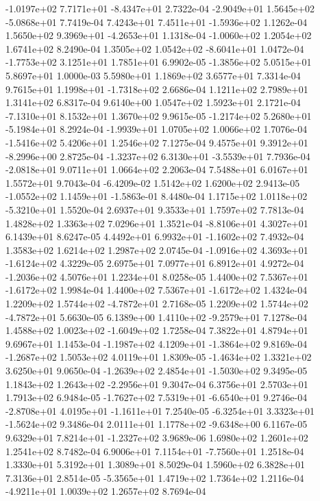 -1.0197e+02  7.7171e+01 -8.4347e+01  2.7322e-04
-2.9049e+01  1.5645e+02 -5.0868e+01  7.7419e-04
 7.4243e+01  7.4511e+01 -1.5936e+02  1.1262e-04
 1.5650e+02  9.3969e+01 -4.2653e+01  1.1318e-04
-1.0060e+02  1.2054e+02  1.6741e+02  8.2490e-04
 1.3505e+02  1.0542e+02 -8.6041e+01  1.0472e-04
-1.7753e+02  3.1251e+01  1.7851e+01  6.9902e-05
-1.3856e+02  5.0515e+01  5.8697e+01  1.0000e-03
5.5980e+01 1.1869e+02 3.6577e+01  7.3314e-04
 9.7615e+01  1.1998e+01 -1.7318e+02  2.6686e-04
1.1211e+02 2.7989e+01 1.3141e+02  6.8317e-04
9.6140e+00 1.0547e+02 1.5923e+01  2.1721e-04
-7.1310e+01  8.1532e+01  1.3670e+02  9.9615e-05
-1.2174e+02  5.2680e+01 -5.1984e+01  8.2924e-04
-1.9939e+01  1.0705e+02  1.0066e+02  1.7076e-04
-1.5416e+02  5.4206e+01  1.2546e+02  7.1275e-04
 9.4575e+01  9.3912e+01 -8.2996e+00  2.8725e-04
-1.3237e+02  6.3130e+01 -3.5539e+01  7.7936e-04
-2.0818e+01  9.0711e+01  1.0664e+02  2.2063e-04
7.5488e+01 6.0167e+01 1.5572e+01  9.7043e-04
-6.4209e-02  1.5142e+02  1.6200e+02  2.9413e-05
-1.0552e+02  1.1459e+01 -1.5863e-01  8.4480e-04
 1.1715e+02  1.0118e+02 -5.3210e+01  1.5520e-04
2.6937e+01 9.3533e+01 1.7597e+02  7.7813e-04
1.4828e+02 1.3363e+02 7.0296e+01  1.3521e-04
-8.8106e+01  4.3027e+01  6.1439e+01  8.6247e-05
 4.4492e+01  6.9932e+01 -1.1602e+02  7.4932e-04
1.3583e+02 1.6214e+02 1.2987e+02  2.0745e-04
-1.0916e+02  4.3693e+01 -1.6124e+02  4.3229e-05
2.6975e+01 7.0977e+01 6.8912e+01  4.9272e-04
-1.2036e+02  4.5076e+01  1.2234e+01  8.0258e-05
 1.4400e+02  7.5367e+01 -1.6172e+02  1.9984e-04
 1.4400e+02  7.5367e+01 -1.6172e+02  1.4324e-04
 1.2209e+02  1.5744e+02 -4.7872e+01  2.7168e-05
 1.2209e+02  1.5744e+02 -4.7872e+01  5.6630e-05
 6.1389e+00  1.4110e+02 -9.2579e+01  7.1278e-04
 1.4588e+02  1.0023e+02 -1.6049e+02  1.7258e-04
7.3822e+01 4.8794e+01 9.6967e+01  1.1453e-04
-1.1987e+02  4.1209e+01 -1.3864e+02  9.8169e-04
-1.2687e+02  1.5053e+02  4.0119e+01  1.8309e-05
-1.4634e+02  1.3321e+02  3.6250e+01  9.0650e-04
-1.2639e+02  2.4854e+01 -1.5030e+02  9.3495e-05
 1.1843e+02  1.2643e+02 -2.2956e+01  9.3047e-04
6.3756e+01 2.5703e+01 1.7913e+02  6.9484e-05
-1.7627e+02  7.5319e+01 -6.6540e+01  9.2746e-04
-2.8708e+01  4.0195e+01 -1.1611e+01  7.2540e-05
-6.3254e+01  3.3323e+01 -1.5624e+02  9.3486e-04
 2.0111e+01  1.1778e+02 -9.6348e+00  6.1167e-05
 9.6329e+01  7.8214e+01 -1.2327e+02  3.9689e-06
1.6980e+02 1.2601e+02 1.2541e+02  8.7482e-04
 6.9006e+01  7.1154e+01 -7.7560e+01  1.2518e-04
1.3330e+01 5.3192e+01 1.3089e+01  8.5029e-04
1.5960e+02 6.3828e+01 7.3136e+01  2.8514e-05
-5.3565e+01  1.4719e+02  1.7364e+02  1.2116e-04
-4.9211e+01  1.0039e+02  1.2657e+02  8.7694e-04
